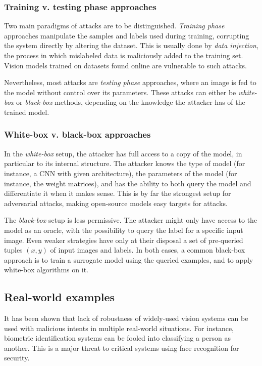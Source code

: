 \documentclass[twocolumn]{../../cs-classes/cs-classes}
\begin{document}
\subsubsection{Training v. testing phase approaches}
Two main paradigms of attacks are to be distinguished. \emph{Training phase} approaches manipulate the samples and labels used during training, corrupting the system directly by altering the dataset. This is usually done by \emph{data injection}, the process in which mislabeled data is maliciously added to the training set. Vision models trained on datasets found online are vulnerable to such attacks. 

Nevertheless, most attacks are \emph{testing phase} approaches, where an image is fed to the model without control over its parameters. These attacks can either be \emph{white-box} or \emph{black-box} methods, depending on the knowledge the attacker has of the trained model.

\subsubsection{White-box v. black-box approaches}
In the \emph{white-box} setup, the attacker has full access to a copy of the model, in particular to its internal structure. The attacker knows the type of model (for instance, a CNN with given architecture), the parameters of the model (for instance, the weight matrices), and has the ability to both query the model and differentiate it when it makes sense. This is by far the strongest setup for adversarial attacks, making open-source models easy targets for attacks.

The \emph{black-box} setup is less permissive. The attacker might only have access to the model as an oracle, with the possibility to query the label for a specific input image. Even weaker strategies have only at their disposal a set of pre-queried tuples $(x, y)$ of input images and labels. In both cases, a common black-box approach is to train a surrogate model using the queried examples, and to apply white-box algorithms on it.

\subsection{Real-world examples}
It has been shown that lack of robustness of widely-used vision systems can be used with malicious intents in multiple real-world situations. For instance, biometric identification systems can be fooled into classifying a person as another. This is a major threat to critical systems using face recognition for security. 
\end{document}
